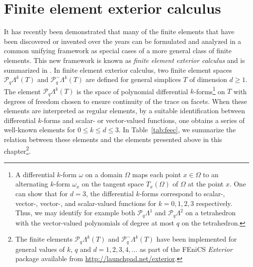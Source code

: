 \section{Finite element exterior calculus}
It has recently been demonstrated that many of the finite elements
that have been discovered or invented over the years can be formulated
and analyzed in a common unifying framework as special cases of a more
general class of finite elements. This new framework is known as
\emph{finite element exterior calculus} and is summarized
in \citet{ArnoldFalkWinther2006}. In finite element exterior calculus,
two finite element spaces $\mathcal{P}_q\Lambda^k(T)$ and
$\mathcal{P}_q^-\Lambda^k(T)$ are defined for general simplices $T$ of
dimension $d \geqslant1$. The element $\mathcal{P}_q\Lambda^k(T)$ is
the space of polynomial differential $k$-forms\footnote{A differential
  $k$-form $\omega$ on a domain $\Omega$ maps each point $x \in
  \Omega$ to an alternating $k$-form $\omega_x$ on the tangent space
  $T_x(\Omega)$ of $\Omega$ at the point $x$. One can show that for
  $d=3$, the differential $k$-forms correspond to scalar-, vector-,
  vector-, and scalar-valued functions for $k=0,1,2,3$
  respectively. Thus, we may identify for example both
  $\mathcal{P}_q\Lambda^1$ and $\mathcal{P}_q\Lambda^2$ on a
  tetrahedron with the vector-valued polynomials of degree at most $q$
  on the tetrahedron.} on $T$ with degrees of freedom chosen to ensure
continuity of the trace on facets. When these elements are interpreted
as regular elements, by a suitable identification between differential
$k$-forms and scalar- or vector-valued functions, one obtains a series
of well-known elements for $0\leqslant k \leqslant d \leqslant 3$. In
Table~\ref{tab:feec}, we summarize the relation between these elements
and the elements presented above in this chapter\footnote{The finite
  elements $\mathcal{P}_q\Lambda^k(T)$ and
  $\mathcal{P}_q^-\Lambda^k(T)$ have been implemented for general
  values of $k$, $q$ and $d=1,2,3,4,\ldots$ as part of the FEniCS
  \emph{Exterior} package available from
  \url{http://launchpad.net/exterior}.}.

